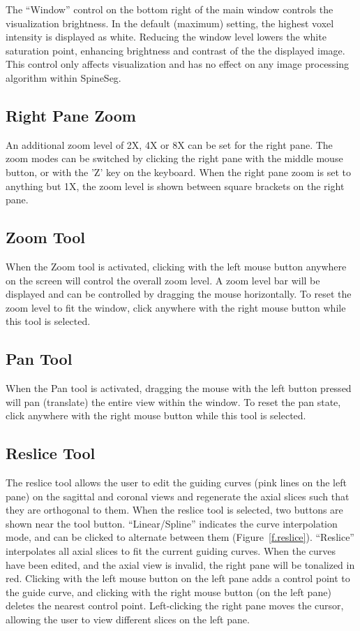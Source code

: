 \documentclass[12pt]{report}
\begin{document}
The ``Window'' control on the bottom right of the main window controls
the visualization brightness. In the default (maximum) setting, the
highest voxel intensity is displayed as white. Reducing the window
level lowers the white saturation point, enhancing brightness and
contrast of the the displayed image. This control only affects
visualization and has no effect on any image processing algorithm
within SpineSeg.

\subsection{Right Pane Zoom}

An additional zoom level of 2X, 4X or 8X can be set for the right
pane. The zoom modes can be switched by clicking the right pane with
the middle mouse button, or with the 'Z' key on the keyboard. When the
right pane zoom is set to anything but 1X, the zoom level is shown
between square brackets on the right pane.

\subsection{Zoom Tool}

When the Zoom tool is activated, clicking with the left mouse button
anywhere on the screen will control the overall zoom level. A zoom
level bar will be displayed and can be controlled by dragging the
mouse horizontally. To reset the zoom level to fit the window, click
anywhere with the right mouse button while this tool is selected.

\subsection{Pan Tool}

When the Pan tool is activated, dragging the mouse with the left
button pressed will pan (translate) the entire view within the
window. To reset the pan state, click anywhere with the right mouse
button while this tool is selected.

\subsection{Reslice Tool}

The reslice tool allows the user to edit the guiding curves (pink
lines on the left pane) on the sagittal and coronal views and
regenerate the axial slices such that they are orthogonal to
them. When the reslice tool is selected, two buttons are shown near
the tool button. ``Linear/Spline'' indicates the curve interpolation
mode, and can be clicked to alternate between them
(Figure~\ref{f.reslice}). ``Reslice'' interpolates all axial slices to
fit the current guiding curves. When the curves have been edited, and
the axial view is invalid, the right pane will be tonalized in
red. Clicking with the left mouse button on the left pane adds a
control point to the guide curve, and clicking with the right mouse
button (on the left pane) deletes the nearest control
point. Left-clicking the right pane moves the cursor, allowing the
user to view different slices on the left pane.
\end{document}
